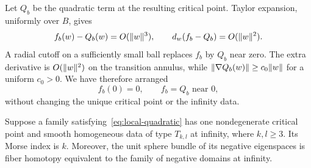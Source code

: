 Let $Q_b$ be the quadratic term at the resulting critical point. Taylor expansion, uniformly over $B$, gives
\[
 f_b(w)-Q_b(w)=O(\lVert w\rVert^3),\qquad
 d_w(f_b-Q_b)=O(\lVert w\rVert^2).
\]
A radial cutoff on a sufficiently small ball replaces $f_b$ by $Q_b$ near zero. The extra derivative is $O(\lVert w\rVert^2)$ on the transition annulus, while $\lVert\nabla Q_b(w)\rVert\geq c_0\lVert w\rVert$ for a uniform $c_0>0$. We have therefore arranged
\begin{equation}\label{eq:local-quadratic}
 f_b(0)=0,\qquad f_b=Q_b\text{ near }0,
\end{equation}
without changing the unique critical point or the infinity data.

\begin{lemma}\label{lem:morse-sublevels}
Suppose a family satisfying~\eqref{eq:local-quadratic} has one nondegenerate critical point and smooth homogeneous data of type $T_{k,l}$ at infinity, where $k,l\geq3$. Its Morse index is $k$. Moreover, the unit sphere bundle of its negative eigenspaces is fiber homotopy equivalent to the family of negative domains at infinity.
\end{lemma}

